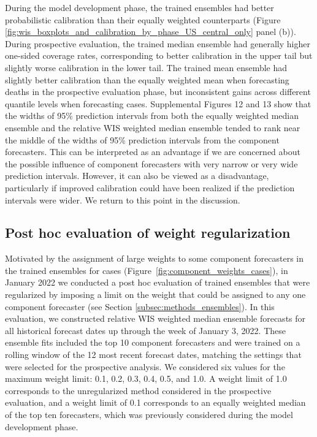 \documentclass[11pt,3p,authoryear]{elsarticle}
\begin{document}
During the model development phase, the trained ensembles had better probabilistic calibration than their equally weighted counterparts (Figure \ref{fig:wis_boxplots_and_calibration_by_phase_US_central_only} panel (b)).
During prospective evaluation, the trained median ensemble had generally higher one-sided coverage rates, corresponding to better calibration in the upper tail but slightly worse calibration in the lower tail.
The trained mean ensemble had slightly better calibration than the equally weighted mean when forecasting deaths in the prospective evaluation phase, but inconsistent gains across different quantile levels when forecasting cases.
Supplemental Figures 12 and 13 show that the widths of 95\% prediction intervals from both the equally weighted median ensemble and the relative WIS weighted median ensemble tended to rank near the middle of the widths of 95\% prediction intervals from the component forecasters.
This can be interpreted as an advantage if we are concerned about the possible influence of component forecasters with very narrow or very wide prediction intervals. However, it can also be viewed as a disadvantage, particularly if improved calibration could have been realized if the prediction intervals were wider. We return to this point in the discussion.

\subsection{Post hoc evaluation of weight regularization}
\label{subsec:results_regularization}

Motivated by the assignment of large weights to some component forecasters in the trained ensembles for cases (Figure~\ref{fig:component_weights_cases}), in January 2022 we conducted a post hoc evaluation of trained ensembles that were regularized by imposing a limit on the weight that could be assigned to any one component forecaster (see Section \ref{subsec:methods_ensembles}). In this evaluation, we constructed relative WIS weighted median ensemble forecasts for all historical forecast dates up through the week of January 3, 2022. These ensemble fits included the top 10 component forecasters and were trained on a rolling window of the 12 most recent forecast dates, matching the settings that were selected for the prospective analysis. We considered six values for the maximum weight limit: 0.1, 0.2, 0.3, 0.4, 0.5, and 1.0. A weight limit of 1.0 corresponds to the unregularized method considered in the prospective evaluation, and a weight limit of 0.1 corresponds to an equally weighted median of the top ten forecasters, which was previously considered during the model development phase.
\end{document}
